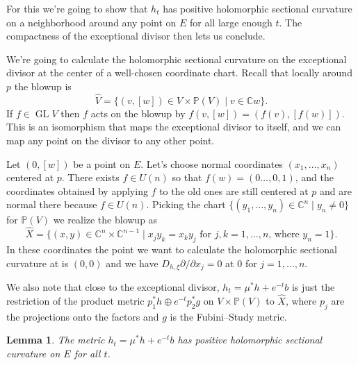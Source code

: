 \documentclass[10pt,a4paper]{amsart}
\newtheorem{lemm}[theo]{Lemma}
\newcommand{\kk}[1]{\mathbb{#1}}
\DeclareMathOperator{\GL}{GL}
\def\hsc{holomorphic sectional curvature}
\def\bl#1{\widehat{#1}}
\begin{document}
For this we're going to show that $h_t$ has positive \hsc{} on a neighborhood
around any point on $E$ for all large enough $t$.
The compactness of the exceptional divisor then lets us conclude.

We're going to calculate the \hsc{} on the exceptional divisor
at the center of a well-chosen coordinate chart.
Recall that locally around $p$ the blowup is
$$
\bl V
= \{ (v,[w]) \in V \times \kk P(V) \mid v \in \kk C w \}.
$$
If $f \in \GL V$ then $f$ acts on the blowup by $f(v, [w]) = (f(v), [f(w)])$.
This is an isomorphism that maps the exceptional divisor to itself, and we can
map any point on the divisor to any other point.

Let $(0, [w])$ be a point on $E$.
Let's choose normal coordinates $(x_1,\ldots,x_n)$ centered at $p$.
There exists $f \in U(n)$ so that $f(w) = (0 \ldots, 0, 1)$, and the
coordinates obtained by applying $f$ to the old ones are still centered at $p$
and are normal there because $f \in U(n)$.
Picking the chart $\{(y_1, \ldots, y_n) \in \kk C^n \mid y_n \not= 0 \}$ for
$\kk P(V)$
we realize the blowup as
$$
\bl X
= \{ (x,y) \in \kk C^n \times \kk C^{n-1}
\mid x_j y_k = x_k y_j \text{ for $j,k = 1,\ldots,n$, where $y_n = 1$}  \}.
$$
In these coordinates the point we want to calculate the \hsc{} at is $(0,0)$
and we have $D_{h,\xi} \partial / \partial x_j = 0$ at $0$ for $j = 1, \ldots, n$.

We also note that close to the exceptional divisor, $h_t = \mu^* h + e^{-t} b$ is
just the restriction of the product metric $p_1^* h \oplus e^{-t} p_2^* g$ on
$V \times \kk P(V)$ to $\bl X$, where $p_j$ are the projections onto the
factors and $g$ is the Fubini--Study metric.


\begin{lemm}
The metric $h_t = \mu^*h + e^{-t} b$ has positive \hsc{} on $E$ for all $t$.
\end{lemm}
\end{document}
